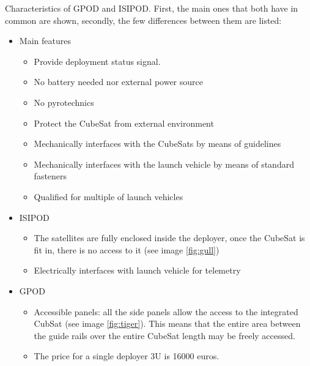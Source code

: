 Characteristics of GPOD and ISIPOD. First, the main ones that both have in common are shown, secondly, the few differences between them are listed:
\begin{itemize}
\item Main features
\begin{itemize}
\item Provide deployment status signal.
\item No battery needed nor external power source
\item No pyrotechnics
\item Protect the CubeSat from external environment
\item Mechanically interfaces with the CubeSats by means of guidelines
\item Mechanically interfaces with the launch vehicle by means of standard fasteners
\item Qualified for multiple of launch vehicles
\end{itemize}
\item ISIPOD 
\begin{itemize}
\item The satellites are fully enclosed inside the deployer, once the CubeSat is fit in, there is no access to it (see image \ref{fig:gull})
\item Electrically interfaces with launch vehicle for telemetry
\end{itemize}
\item GPOD
\begin{itemize}
\item Accessible panels: all the side panels allow the access to the integrated CubSat (see image \ref{fig:tiger}). This means that the entire area between the guide rails over the entire CubeSat length may be freely accessed. 
\item The price for a single deployer 3U is 16000 euros. 
\end{itemize}
\end{itemize}

